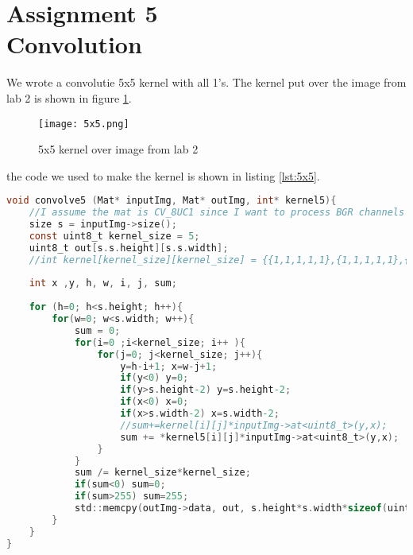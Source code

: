 \section {Assignment 5 \\ {Convolution}}
\label {sec:assignment_5}

We wrote a convolutie 5x5 kernel with all 1's. The kernel put over the image from lab 2 is shown in figure \ref{fig:5x5}.

\begin{figure}[h!]
    \centering
    \texttt{[image: 5x5.png]}
    \caption{5x5 kernel over image from lab 2}
    \label{fig:5x5}
\end{figure}

the code we used to make the kernel is shown in listing \ref{lst:5x5}.

\begin{lstlisting}[language=C, caption=5x5 kernel, label=lst:5x5]
void convolve5 (Mat* inputImg, Mat* outImg, int* kernel5){
    //I assume the mat is CV_8UC1 since I want to process BGR channels individually
    size s = inputImg->size();
    const uint8_t kernel_size = 5;
    uint8_t out[s.s.height][s.s.width];
    //int kernel[kernel_size][kernel_size] = {{1,1,1,1,1},{1,1,1,1,1},{1,1,1,1,1},{1,1,1,1,1},{1,1,1,1,1}};
    
    int x ,y, h, w, i, j, sum;
  
    for (h=0; h<s.height; h++){
        for(w=0; w<s.width; w++){
            sum = 0;
            for(i=0 ;i<kernel_size; i++ ){
                for(j=0; j<kernel_size; j++){
                    y=h-i+1; x=w-j+1;
                    if(y<0) y=0;
                    if(y>s.height-2) y=s.height-2;
                    if(x<0) x=0;
                    if(x>s.width-2) x=s.width-2;
                    //sum+=kernel[i][j]*inputImg->at<uint8_t>(y,x);
                    sum += *kernel5[i][j]*inputImg->at<uint8_t>(y,x);
                }
            }
            sum /= kernel_size*kernel_size;
            if(sum<0) sum=0;
            if(sum>255) sum=255;
            std::memcpy(outImg->data, out, s.height*s.width*sizeof(uint8_t));
        }
    }
}
\end{lstlisting}